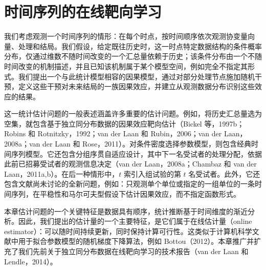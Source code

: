 \chapter{时间序列的在线靶向学习}
\label{ch:online-targeted-learning-time-series}

我们考虑观测一个时间序列的情形：在每个时点，按时间顺序依次观测协变量向量、处理和结局。我们假设，给定既往历史时，这一时点特定数据结构的条件概率分布，仅通过维数不随时间改变的一个汇总量依赖于历史；该条件分布由一个不随时间改变的机制描述，并且已知该机制属于某个模型空间，例如完全不指定其形式。我们提出一个与此统计模型相容的因果模型，通过对部分处理节点施加随机干预，定义这些干预对未来结局的一族因果效应，并建立从观测数据分布识别这些效应的结果。

这一统计估计问题的一般表述涵盖许多重要的估计问题。例如，将历史汇总量选为空集，就包含基于独立同分布数据的因果效应靶向估计（Bickel 等，1997b；Robins 和 Rotnitzky，1992；van der Laan 和 Rubin，2006；van der Laan，2008a；van der Laan 和 Rose，2011）。对条件密度选择参数模型，则包含经典时间序列模型。它还包含分组序贯自适应设计，其中下一名受试者的处理分配，依据此前已招募受试者的观测信息决定（van der Laan，2008a；Chambaz 和 van der Laan，2011a,b）。在后一种情形中，$t$ 索引入组试验的第 $t$ 名受试者。此外，它还包含文献尚未讨论的全新问题，例如：只观测单个单位或指定的一组单位的一条时间序列，在平稳性和马尔可夫型假设下估计因果效应，而不指定函数形式。

\begin{sourcebox}
本章估计问题的一个关键特征是数据具有顺序，统计推断基于时间维度的渐近分析。因此，我们提出的估计量的一个主要特征，是它们属于在线估计量（online estimator）：可以随时间持续更新，同时保持计算可行性。这类似于计算机科学文献中用于拟合参数模型的随机梯度下降算法，例如 Bottou（2012）。本章推广并扩充了我们先前关于独立同分布数据在线靶向学习的技术报告（van der Laan 和 Lendle，2014）。
\end{sourcebox}

